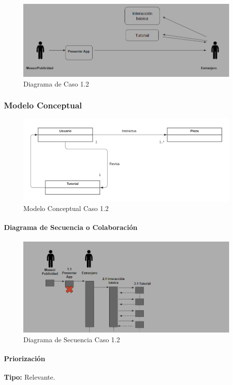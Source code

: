 \begin{figure}[H]
\centerline{\includegraphics[width=15cm]{imgs/CasoUso_2.PNG}}
\caption{Diagrama de Caso 1.2}
\label{fig_2_1}
\end{figure}

\subsubsection{Modelo Conceptual}

\begin{figure}[H]
\centerline{\includegraphics[width=15cm]{imgs/ModeloConceptualCaso_2_3.png}}
\caption{Modelo Conceptual Caso 1.2}
\label{fig_2_2}
\end{figure}

\paragraph{Diagrama de Secuencia o Colaboración}

\begin{figure}[H]
\centerline{\includegraphics[width=15cm]{imgs/CasoUso_2_2.PNG}}
\caption{Diagrama de Secuencia Caso 1.2}
\label{fig_2_3}
\end{figure}

\paragraph{Priorización}
{\textbf {Tipo:}}
Relevante.